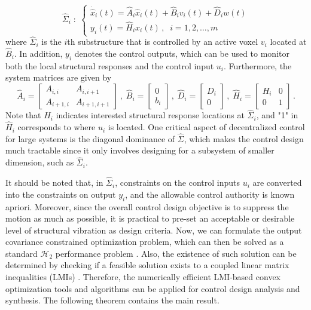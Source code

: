 \documentclass[11pt]{ucthesis}
\begin{document}
\begin{equation}
\hat{\Sigma}_i\;:\; \left \{
\begin{array}{l}
\dot{\hat{x}}_i (t) = \hat{A}_i \hat{x}_i (t) + \hat{B}_i v_i (t) + \hat{D}_i w(t) \\
y_i (t) = \hat{H}_i x_i (t) \,,\;\; i = 1,2,\dots, m
\end{array}
\right .
\label{eqn:sys}
\end{equation}
where $\hat{\Sigma}_i$ is the $i$th substructure that is controlled by an active voxel $v_i$ located at $\hat{B}_i$. In addition, $y_i$ denotes the control outputs, which can be used to monitor both the local structural responses and the control input $u_i$. Furthermore, the system matrices are given by
\[
\hat{A}_i = \left [
\begin{array}{cc}
A_{i,i} & A_{i,i+1} \\
A_{i+1,i} & A_{i+1,i+1}
\end{array}
\right ] \,,\;\hat{B}_i = \left [
\begin{array}{c}
0 \\
b_i
\end{array}
\right ] \,,\;\hat{D}_i = \left [
\begin{array}{c}
D_i \\
0
\end{array}
\right ] \,,\;\hat{H}_i = \left [
\begin{array}{cc}
H_i & 0 \\
0& 1
\end{array}
\right ] \,.
\]
Note that $H_i$ indicates interested structural response locations at $\hat{\Sigma}_i$, and "1" in $\hat{H}_i$ corresponds to where $u_i$ is located. One critical aspect of decentralized control for large systems is the diagonal dominance of $\hat{\Sigma}$, which makes the control design much tractable since it only involves designing for a subsystem of smaller dimension, such as $\hat{\Sigma}_i$. 

It should be noted that, in $\hat{\Sigma}_i$, constraints on the control inputs $u_i$ are converted into the constraints on output $y_i$, and the allowable control authority is known apriori. Moreover, since the overall control design objective is to suppress the motion as much as possible, it is practical to pre-set an acceptable or desirable level of structural vibration as design criteria. Now, we can formulate the output covariance constrained optimization problem, which can then be solved as a standard $\mathcal{H}_2$ performance problem \cite{zhu1997convergent}. Also, the existence of such solution can be determined by checking if a feasible solution exists to a coupled linear matrix inequalities (LMIs) \cite{swei2015lmi}. Therefore, the numerically efficient LMI-based convex optimization tools and algorithms can be applied for control design analysis and synthesis. The following theorem contains the main result.
\end{document}
